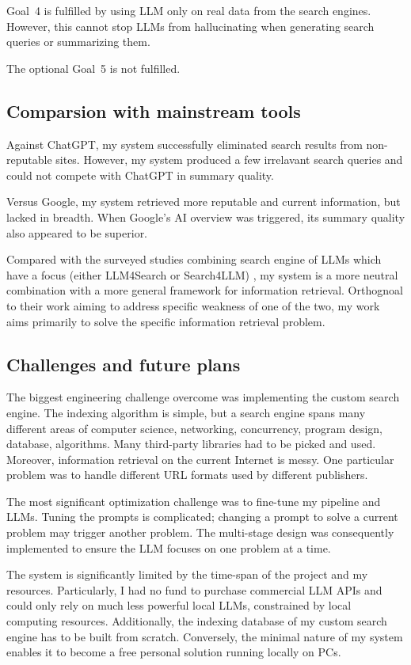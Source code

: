 \documentclass[final-report]{report-template}
\begin{document}
Goal~4 is fulfilled by using LLM only on real data from the search engines.
However, this cannot stop LLMs from hallucinating when generating search
queries or summarizing them.

The optional Goal~5 is not fulfilled.

\subsection{Comparsion with mainstream tools}
Against ChatGPT, my system successfully eliminated search results from
non-reputable sites. However, my system produced a few irrelavant search
queries and could not compete with ChatGPT in summary quality.

Versus Google, my system retrieved more reputable and current
information, but lacked in breadth. When Google's AI overview was triggered,
its summary quality also appeared to be superior.

Compared with the surveyed studies combining search engine of LLMs which have a
focus (either LLM4Search or Search4LLM) \cite{llm.meet.search.1}, my system is
a more neutral combination with a more general framework for information
retrieval. Orthognoal to their work aiming to address specific weakness of one
of the two, my work aims primarily to solve the specific information retrieval
problem.

\subsection{Challenges and future plans}
The biggest engineering challenge overcome was implementing the custom search
engine. The indexing algorithm is simple, but a search engine spans
many different areas of computer science, networking, concurrency, program
design, database, algorithms. Many third-party libraries had to be picked and
used. Moreover, information retrieval on the current Internet is messy. One
particular problem was to handle different URL formats used by different
publishers.

The most significant optimization challenge was to fine-tune my pipeline and
LLMs. Tuning the prompts is complicated; changing a prompt to solve a current
problem may trigger another problem. The multi-stage design was consequently
implemented to ensure the LLM focuses on one problem at a time.

The system is significantly limited by the time-span of the project and my
resources. Particularly, I had no fund to purchase commercial LLM APIs and
could only rely on much less powerful local LLMs, constrained by local
computing resources. Additionally, the indexing database of my custom search
engine has to be built from scratch. Conversely, the minimal nature of my
system enables it to become a free personal solution running locally on PCs.
\end{document}
